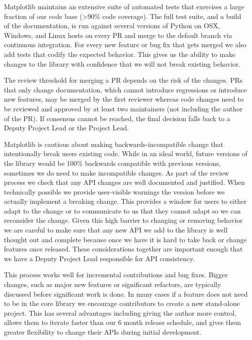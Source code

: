 \documentclass[12pt]{article}
\numberwithin{page}{section}
\begin{document}
Matplotlib maintains an extensive suite of automated tests that
exercises a large fraction of our code base (>90\% code coverage).  The full test suite, and
a build of the documentation, is run against several versions of
Python on OSX, Windows, and Linux hosts on every PR and merge to the
default branch via continuous integration.  For every new feature or
bug fix that gets merged we also add tests that codify the expected
behavior.  This gives us the ability to make changes to the library
with confidence that we will not break existing behavior.

The review threshold for merging a PR depends on the risk of the changes.  PRs
that only change documentation, which cannot introduce regressions or introduce
new features, may be merged by the first reviewer whereas code changes need to
be reviewed and approved by at least two maintainers (not including the author
of the PR).  If consensus cannot be reached, the final decision falls back to a
Deputy Project Lead or the Project Lead.

Matplotlib is cautious about making backwards-incompatible change that
intentionally break users existing code.  While in an ideal world, future
versions of the library would be 100\% backwards compatible with previous
versions, sometimes we do need to make incompatible changes.  As part of the
review process we check that any API changes are well documented and justified.
When technically possible we provide user-visible warnings the version before
we actually implement a breaking change.  This provides a window for users to
either adapt to the change or to communicate to us that they cannot adapt so we
can reconsider the change.  Given this high barrier to changing or removing
behavior we are careful to make sure that any new API we add to the library is
well thought out and complete because once we have it is hard to take back or
change features once released.  These considerations together are important
enough that we have a Deputy Project Lead responsible for API consistency.

This process works well for incremental contributions and bug fixes.  Bigger
changes, such as major new features or significant refactors, are typically
discussed before significant work is done.  In many cases if a feature does not
need to be in the core library we encourage contributors to create a new
stand-alone project.  This has several advantages including giving the
author more control, allows them to iterate faster than our 6 month release
schedule, and gives them greater flexibility to change their APIs during
initial development.
\end{document}
